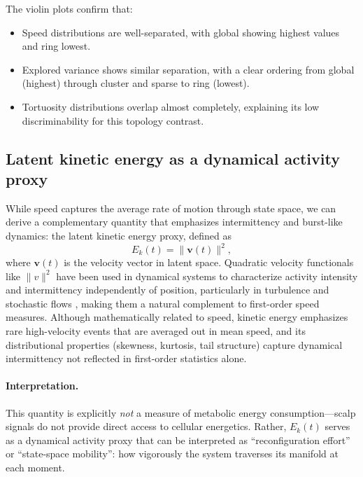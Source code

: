 \documentclass[5p,twocolumn,authoryear]{elsarticle}
\begin{document}
The violin plots confirm that:
\begin{itemize}
    \item Speed distributions are well-separated, with global showing highest values and ring lowest.
    \item Explored variance shows similar separation, with a clear ordering from global (highest) through cluster and sparse to ring (lowest).
    \item Tortuosity distributions overlap almost completely, explaining its low discriminability for this topology contrast.
\end{itemize}

\subsection{Latent kinetic energy as a dynamical activity proxy}

While speed captures the average rate of motion through state space, we can derive a complementary quantity that emphasizes intermittency and burst-like dynamics: the latent kinetic energy proxy, defined as
\begin{equation}
E_k(t) = \|\mathbf{v}(t)\|^2,
\end{equation}
where $\mathbf{v}(t)$ is the velocity vector in latent space. Quadratic velocity functionals like $\|v\|^2$ have been used in dynamical systems to characterize activity intensity and intermittency independently of position, particularly in turbulence and stochastic flows \citep{Frisch1995,Falkovich2001}, making them a natural complement to first-order speed measures. Although mathematically related to speed, kinetic energy emphasizes rare high-velocity events that are averaged out in mean speed, and its distributional properties (skewness, kurtosis, tail structure) capture dynamical intermittency not reflected in first-order statistics alone.

\paragraph{Interpretation.}
This quantity is explicitly \emph{not} a measure of metabolic energy consumption---scalp signals do not provide direct access to cellular energetics. Rather, $E_k(t)$ serves as a dynamical activity proxy that can be interpreted as ``reconfiguration effort'' or ``state-space mobility'': how vigorously the system traverses its manifold at each moment.
\end{document}
